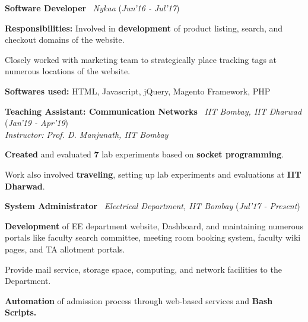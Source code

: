 \documentclass[10pt]{article}
\newcommand{\highlight}[1]{\framecolorbox[\textwidth]{black}{bl}{\makebox[\textwidth][l]{\bfseries \color{black} #1}}}
\newcommand{\mystyle}[1]{\textit{\textit{\textcolor{llb}{#1}}}}
\newcommand{\guide}[1]{\textit{\textit{\textcolor{llb}{#1}}}}
\begin{document}
	\highlight{WORK EXPERIENCE}
	\begin{myitemize}
		\item \textbf{Software Developer} \textpipe\ \mystyle{Nykaa} \hfill{(\textit{Jun'16 - Jul'17})}
		\begin{myitemize}
			\item \textbf{Responsibilities:} Involved in \textbf{development} of product listing, search, and checkout domains of the website.
			\item Closely worked with marketing team to strategically place tracking tags at numerous locations of the website.
			\item \textbf{Softwares used:} HTML, Javascript, jQuery, Magento Framework, PHP
		\end{myitemize}

		\item \textbf{Teaching Assistant: Communication Networks} \textpipe\ \mystyle{IIT Bombay, IIT Dharwad} \hfill{(\textit{Jan'19 - Apr'19})}\\
		\guide{Instructor: Prof. D. Manjunath, IIT Bombay}
		\begin{myitemize}
			\item \textbf{Created} and evaluated \textbf{7} lab experiments based on \textbf{socket programming}.
			\item Work also involved \textbf{traveling}, setting up lab experiments and evaluations at \textbf{IIT Dharwad}.
		\end{myitemize}

		\item \textbf{System Administrator} \textpipe\ \mystyle{Electrical Department, IIT Bombay} \hfill{(\textit{Jul'17 - Present})}
		\begin{myitemize}
			\item \textbf{Development} of EE department website, Dashboard, and maintaining numerous portals like faculty search committee, meeting room booking system, faculty wiki pages, and TA allotment portals.
			\item Provide mail service, storage space, computing, and network facilities to the Department.
			\item \textbf{Automation} of admission process through web-based services and \textbf{Bash Scripts.}
		\end{myitemize}
	\end{myitemize}
\end{document}
